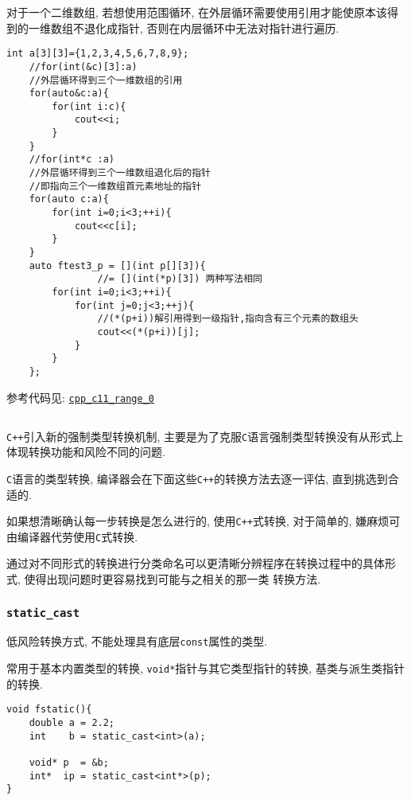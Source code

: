 对于一个二维数组, 若想使用范围循环, 在外层循环需要使用引用才能使原本该得到的一维数组不退化成指针, 否则在内层循环中无法对指针进行遍历.

\begin{lstlisting}[xleftmargin=2em,xrightmargin=2em]
	int a[3][3]={1,2,3,4,5,6,7,8,9};
	//for(int(&c)[3]:a)
	//外层循环得到三个一维数组的引用
	for(auto&c:a){
		for(int i:c){
			cout<<i;
		}
	}
	//for(int*c :a)
	//外层循环得到三个一维数组退化后的指针
	//即指向三个一维数组首元素地址的指针
	for(auto c:a){
		for(int i=0;i<3;++i){
			cout<<c[i];
		}
	}
	auto ftest3_p = [](int p[][3]){
		        //= [](int(*p)[3]) 两种写法相同
		for(int i=0;i<3;++i){
			for(int j=0;j<3;++j){
				//(*(p+i))解引用得到一级指针,指向含有三个元素的数组头
				cout<<(*(p+i))[j];
			}
		}
	};
\end{lstlisting}

参考代码见: \href{https://github.com/wenqingqian/Obtuse/tree/main/test/cpp/c++11/range_0}{\tt cpp\_c11\_range\_0}
\subsection{\color{purple}{强制类型转换}}
{\tt C++}引入新的强制类型转换机制, 主要是为了克服{\tt C}语言强制类型转换没有从形式上体现转换功能和风险不同的问题.

{\tt C}语言的类型转换, 编译器会在下面这些{\tt C++}的转换方法去逐一评估, 直到挑选到合适的. 

如果想清晰确认每一步转换是怎么进行的, 使用{\tt C++}式转换, 对于简单的, 嫌麻烦可由编译器代劳使用{\tt C}式转换.

通过对不同形式的转换进行分类命名可以更清晰分辨程序在转换过程中的具体形式, 使得出现问题时更容易找到可能与之相关的那一类
	转换方法. 
\subsubsection{\tt{static\_cast}}
\begin{paracol}{2}
	\begin{leftcolumn}
		低风险转换方式, 不能处理具有底层{\tt const}属性的类型.

		常用于基本内置类型的转换, {\tt void*}指针与其它类型指针的转换, 基类与派生类指针的转换.
	\end{leftcolumn}	
	\begin{rightcolumn}
		\begin{lstlisting}[xleftmargin=2em,xrightmargin=2em]
void fstatic(){
	double a = 2.2;
	int    b = static_cast<int>(a);

	void* p  = &b;
	int*  ip = static_cast<int*>(p);
}
		\end{lstlisting}
	\end{rightcolumn}
\end{paracol}
